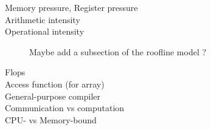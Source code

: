 \begin{description}
\item[Memory pressure, Register pressure]
\item[Arithmetic intensity]
\item[Operational intensity] Maybe add a subsection of the roofline model ?
\item[Flops]
\item[Access function (for array)]
\item[General-purpose compiler]
\item[Communication vs computation]
\item[CPU- vs Memory-bound]
\end{description}
